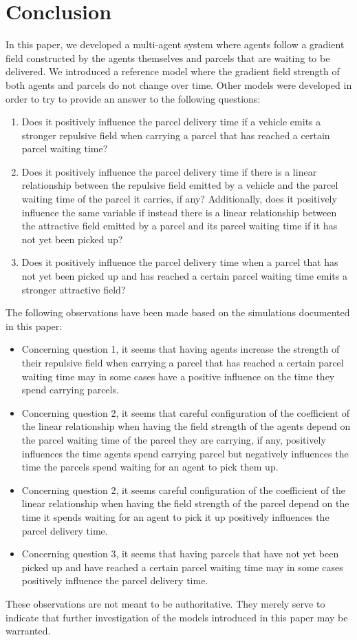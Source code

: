 \section{Conclusion}\label{sec:conclusion}
In this paper, we developed a multi-agent system where agents follow a gradient field constructed by the agents themselves and parcels that are waiting to be delivered. We introduced a reference model where the gradient field strength of both agents and parcels do not change over time. Other models were developed in order to try to provide an answer to the following questions:

\begin{enumerate}
    \item Does it positively influence the parcel delivery time if a vehicle emits a stronger repulsive field when carrying a parcel that has reached a certain parcel waiting time?
    \item Does it positively influence the parcel delivery time if there is a linear relationship between the repulsive field emitted by a vehicle and the parcel waiting time of the parcel it carries, if any? Additionally, does it positively influence the same variable if instead there is a linear relationship between the attractive field emitted by a parcel and its parcel waiting time if it has not yet been picked up?
    \item Does it positively influence the parcel delivery time when a parcel that has not yet been picked up and has reached a certain parcel waiting time emits a stronger attractive field?
\end{enumerate}

The following observations have been made based on the simulations documented in this paper:

\begin{itemize}
    \item Concerning question 1, it seems that having agents increase the strength of their repulsive field when carrying a parcel that has reached a certain parcel waiting time may in some cases have a positive influence on the time they spend carrying parcels.
    \item Concerning question 2, it seems that careful configuration of the coefficient of the linear relationship when having the field strength of the agents depend on the parcel waiting time of the parcel they are carrying, if any, positively influences the time agents spend carrying parcel but negatively influences the time the parcels spend waiting for an agent to pick them up.
    \item Concerning question 2, it seems careful configuration of the coefficient of the linear relationship when having the field strength of the parcel depend on the time it spends waiting for an agent to pick it up positively influences the parcel delivery time.
    \item Concerning question 3, it seems that having parcels that have not yet been picked up and have reached a certain parcel waiting time may in some cases positively influence the parcel delivery time.
\end{itemize}

These observations are not meant to be authoritative. They merely serve to indicate that further investigation of the models introduced in this paper may be warranted.